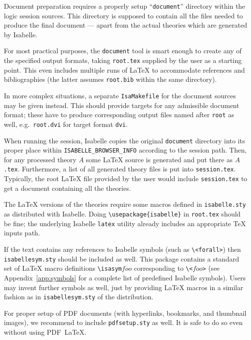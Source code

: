 \medskip Document preparation requires a properly setup ``\texttt{document}''
directory within the logic session sources.  This directory is supposed to
contain all the files needed to produce the final document --- apart from the
actual theories which are generated by Isabelle.

\medskip For most practical purposes, the \texttt{document} tool is smart
enough to create any of the specified output formats, taking \texttt{root.tex}
supplied by the user as a starting point.  This even includes multiple runs of
{\LaTeX} to accommodate references and bibliographies (the latter assumes
\texttt{root.bib} within the same directory).

In more complex situations, a separate \texttt{IsaMakefile} for the document
sources may be given instead.  This should provide targets for any admissible
document format; these have to produce corresponding output files named after
\texttt{root} as well, e.g.\ \texttt{root.dvi} for target format \texttt{dvi}.

\medskip When running the session, Isabelle copies the original
\texttt{document} directory into its proper place within
\texttt{ISABELLE_BROWSER_INFO} according to the session path.  Then, for any
processed theory $A$ some {\LaTeX} source is generated and put there as
$A$\texttt{.tex}.  Furthermore, a list of all generated theory files is put
into \texttt{session.tex}.  Typically, the root {\LaTeX} file provided by the
user would include \texttt{session.tex} to get a document containing all the
theories.

The {\LaTeX} versions of the theories require some macros defined in
\texttt{isabelle.sty} as distributed with Isabelle.  Doing
\verb,\usepackage{isabelle}, in \texttt{root.tex} should be fine; the
underlying Isabelle \texttt{latex} utility already includes an appropriate
{\TeX} inputs path.

If the text contains any references to Isabelle symbols (such as
\verb,\<forall>,) then \texttt{isabellesym.sty} should be included as well.
This package contains a standard set of {\LaTeX} macro definitions
\verb,\isasym,$foo$ corresponding to \verb,\<,$foo$\verb,>, (see
Appendix~\ref{app:symbols} for a complete list of predefined Isabelle
symbols).  Users may invent further symbols as well, just by providing
{\LaTeX} macros in a similar fashion as in \texttt{isabellesym.sty} of the
distribution.

For proper setup of PDF documents (with hyperlinks, bookmarks, and thumbnail
images), we recommend to include \verb,pdfsetup.sty, as well.  It is safe to
do so even without using PDF~\LaTeX.

